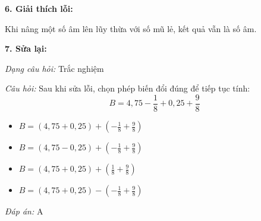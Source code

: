 \noindent\textbf{6. Giải thích lỗi:}

Khi nâng một số âm lên lũy thừa với số mũ lẻ, kết quả vẫn là số âm.

\noindent\textbf{7. Sửa lại:}

\textit{Dạng câu hỏi:} Trắc nghiệm

\textit{Câu hỏi:} Sau khi sửa lỗi, chọn phép biến đổi đúng để tiếp tục tính:
\[
B=4,75-\frac18+0,25+\frac98
\]

\begin{itemize}
    \item[A.] $\displaystyle B=(4,75+0,25)+\left(-\frac18+\frac98\right)$
    \item[B.] $\displaystyle B=(4,75-0,25)+\left(-\frac18+\frac98\right)$
    \item[C.] $\displaystyle B=(4,75+0,25)+\left(\frac18+\frac98\right)$
    \item[D.] $\displaystyle B=(4,75+0,25)-\left(-\frac18+\frac98\right)$
\end{itemize}

\textit{Đáp án:} A